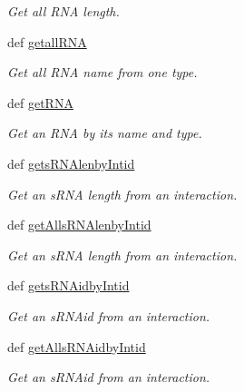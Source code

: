 \begin{DoxyCompactItemize}
\begin{DoxyCompactList}\small\item\em \-Get all \-R\-N\-A length. \end{DoxyCompactList}\item 
def \hyperlink{classirna_1_1David2tulip_1_1Sqlite__manager_1_1Sqlite__manager_acfdee9e75647228924e26ac3fa3bf607}{getall\-R\-N\-A}
\begin{DoxyCompactList}\small\item\em \-Get all \-R\-N\-A name from one type. \end{DoxyCompactList}\item 
def \hyperlink{classirna_1_1David2tulip_1_1Sqlite__manager_1_1Sqlite__manager_aca16ec383015877464d846183241c385}{get\-R\-N\-A}
\begin{DoxyCompactList}\small\item\em \-Get an \-R\-N\-A by its name and type. \end{DoxyCompactList}\item 
def \hyperlink{classirna_1_1David2tulip_1_1Sqlite__manager_1_1Sqlite__manager_ad9e4b80a430f2bbe50529c32923c762a}{gets\-R\-N\-Alenby\-Intid}
\begin{DoxyCompactList}\small\item\em \-Get an s\-R\-N\-A length from an interaction. \end{DoxyCompactList}\item 
def \hyperlink{classirna_1_1David2tulip_1_1Sqlite__manager_1_1Sqlite__manager_aa9bbe58a78817cf9637236f1adde7538}{get\-Alls\-R\-N\-Alenby\-Intid}
\begin{DoxyCompactList}\small\item\em \-Get an s\-R\-N\-A length from an interaction. \end{DoxyCompactList}\item 
def \hyperlink{classirna_1_1David2tulip_1_1Sqlite__manager_1_1Sqlite__manager_aa5e3e215b8a06728ccc645b16f19b7fd}{gets\-R\-N\-Aidby\-Intid}
\begin{DoxyCompactList}\small\item\em \-Get an s\-R\-N\-Aid from an interaction. \end{DoxyCompactList}\item 
def \hyperlink{classirna_1_1David2tulip_1_1Sqlite__manager_1_1Sqlite__manager_abb55fdce59dcb561f5de9db3a0335947}{get\-Alls\-R\-N\-Aidby\-Intid}
\begin{DoxyCompactList}\small\item\em \-Get an s\-R\-N\-Aid from an interaction. \end{DoxyCompactList}\item 

\end{DoxyCompactItemize}
